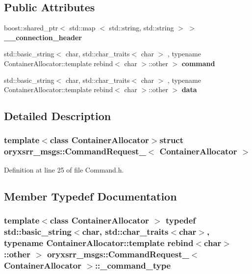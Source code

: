 \subsection*{\-Public \-Attributes}
\begin{DoxyCompactItemize}
\item 
boost\-::shared\-\_\-ptr$<$ std\-::map\*
$<$ std\-::string, std\-::string $>$ $>$ {\bf \-\_\-\-\_\-connection\-\_\-header}
\item 
std\-::basic\-\_\-string$<$ char, \*
std\-::char\-\_\-traits$<$ char $>$\*
, typename \*
\-Container\-Allocator\-::template \*
rebind$<$ char $>$\-::other $>$ {\bf command}
\item 
std\-::basic\-\_\-string$<$ char, \*
std\-::char\-\_\-traits$<$ char $>$\*
, typename \*
\-Container\-Allocator\-::template \*
rebind$<$ char $>$\-::other $>$ {\bf data}
\end{DoxyCompactItemize}


\subsection{\-Detailed \-Description}
\subsubsection*{template$<$class Container\-Allocator$>$struct oryxsrr\-\_\-msgs\-::\-Command\-Request\-\_\-$<$ Container\-Allocator $>$}



\-Definition at line 25 of file \-Command.\-h.



\subsection{\-Member \-Typedef \-Documentation}
\subsubsection[{\-\_\-command\-\_\-type}]{\setlength{\rightskip}{0pt plus 5cm}template$<$class Container\-Allocator $>$ typedef std\-::basic\-\_\-string$<$char, std\-::char\-\_\-traits$<$char$>$, typename \-Container\-Allocator\-::template rebind$<$char$>$\-::other $>$ {\bf oryxsrr\-\_\-msgs\-::\-Command\-Request\-\_\-}$<$ \-Container\-Allocator $>$\-::{\bf \-\_\-command\-\_\-type}}\label{structoryxsrr__msgs_1_1CommandRequest___ae418830d0ccd17ff4a02cf0ac5231006}


